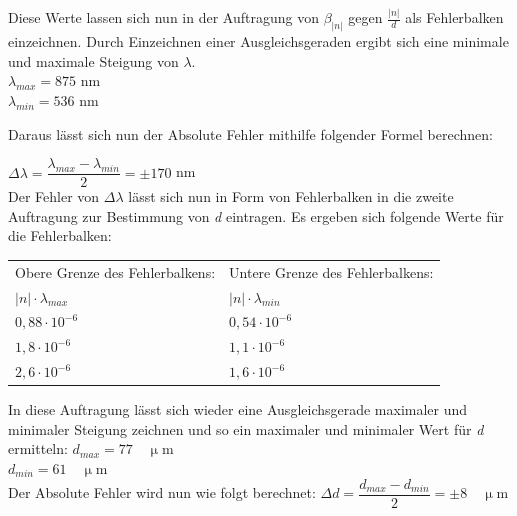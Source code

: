 \documentclass[12pt,a4paper,titlepage,headinclude,bibtotoc]{scrartcl}
\begin{document}
\begin{flushleft}
Diese Werte lassen sich nun in der Auftragung von $ \beta_{|n|} $ gegen $ \frac{|n|}{d} $ als Fehlerbalken einzeichnen. Durch Einzeichnen einer Ausgleichsgeraden ergibt sich eine minimale und maximale Steigung von $ \lambda $.\\
\vspace{0,5 cm}
$ \lambda_{max} = 875$ nm\\
$ \lambda_{min} = 536 $ nm\\
\vspace{0,5 cm}


Daraus lässt sich nun der Absolute Fehler mithilfe folgender Formel berechnen:\\
\vspace{0,5 cm}

$ \Delta \lambda = \dfrac{ \lambda_{max}-\lambda_{min}}{2}= \pm 170 $ nm\\
\vspace{0,5 cm}
Der Fehler von $ \Delta \lambda $ lässt sich nun in Form von Fehlerbalken in die zweite Auftragung zur Bestimmung von \emph{d} eintragen. Es ergeben sich folgende Werte für die Fehlerbalken:
\vspace{1 cm}

\begin{table} [h]
\centering
\begin{tabular}{|p{6 cm}|p{6 cm}|}
		\hline
         Obere Grenze des Fehlerbalkens: & Untere Grenze des Fehlerbalkens: \\
         
         $ {|n|} \cdot {\lambda_{max}} $ & $ {|n|} \cdot {\lambda_{min}} $ \\
         \hline
         ${0,88} \cdot {10^{-6}} $& ${0,54} \cdot {10^{-6}} $ \\
         \hline
         ${1,8} \cdot {10^{-6}} $& ${1,1} \cdot {10^{-6}} $\\
         \hline
         ${2,6} \cdot {10^{-6}} $&${1,6} \cdot {10^{-6}} $ \\
         \hline
\end{tabular}
\end{table}
 
In diese Auftragung lässt sich wieder eine Ausgleichsgerade maximaler und minimaler Steigung zeichnen und so ein maximaler und minimaler Wert für \emph{d} ermitteln:
$ d_{max} = 77  \quad \mathrm{\upmu m}$ \\
$ d_{min} = 61 \quad \mathrm{\upmu m} $\\
Der Absolute Fehler wird nun wie folgt berechnet:
$ \Delta d = \dfrac{ d_{max}-d_{min}}{2}= \pm 8 \quad \mathrm{\upmu m} $\\
\end{flushleft}
\end{document}
